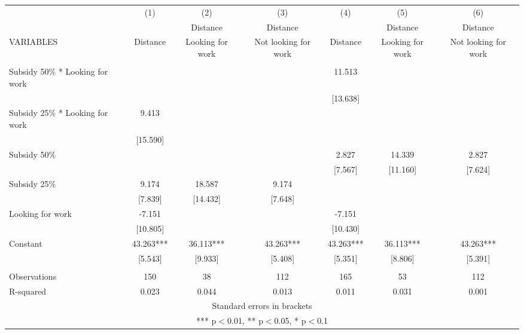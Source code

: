 \begin{tabular}{lcccccc} \hline
 & (1) & (2) & (3) & (4) & (5) & (6) \\
 &  & Distance & Distance &  & Distance & Distance \\
VARIABLES & Distance & Looking for work & Not looking for work & Distance & Looking for work & Not looking for work \\ \hline
 &  &  &  &  &  &  \\
Subsidy 50\% * Looking for work &  &  &  & 11.513 &  &  \\
 &  &  &  & [13.638] &  &  \\
Subsidy 25\% * Looking for work & 9.413 &  &  &  &  &  \\
 & [15.590] &  &  &  &  &  \\
Subsidy 50\% &  &  &  & 2.827 & 14.339 & 2.827 \\
 &  &  &  & [7.567] & [11.160] & [7.624] \\
Subsidy 25\% & 9.174 & 18.587 & 9.174 &  &  &  \\
 & [7.839] & [14.432] & [7.648] &  &  &  \\
Looking for work & -7.151 &  &  & -7.151 &  &  \\
 & [10.805] &  &  & [10.430] &  &  \\
Constant & 43.263*** & 36.113*** & 43.263*** & 43.263*** & 36.113*** & 43.263*** \\
 & [5.543] & [9.933] & [5.408] & [5.351] & [8.806] & [5.391] \\
 &  &  &  &  &  &  \\
Observations & 150 & 38 & 112 & 165 & 53 & 112 \\
 R-squared & 0.023 & 0.044 & 0.013 & 0.011 & 0.031 & 0.001 \\ \hline
\multicolumn{7}{c}{ Standard errors in brackets} \\
\multicolumn{7}{c}{ *** p$<$0.01, ** p$<$0.05, * p$<$0.1} \\
\end{tabular}

